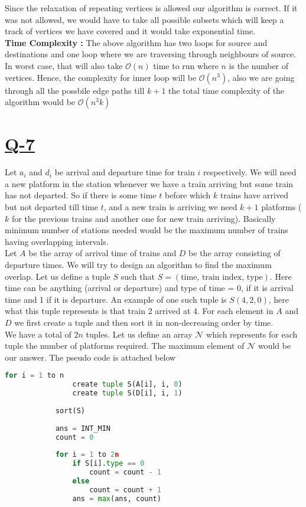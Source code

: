 \documentclass[14pt]{article}
\begin{document}
		Since the relaxation of repeating vertices is allowed our algorithm is correct. If it was not allowed, we would have to take all possible subsets which will keep a track of vertices we have covered and it would take exponential time.\\
		\textbf{Time Complexity : }The above algorithm has two loops for source and destinations and one loop where we are traversing through neighbours of source. In worst case, that will also take $\mathcal{O}(n)$ time to run where $n$ is the number of vertices. Hence, the complexity for inner loop will be $\mathcal{O}(n^3)$, also we are going through all the possbile edge paths till $k+1$ the total time complexity of the algorithm would be $\mathcal{O}(n^3k)$
	
	\section*{\underline{Q-7}}
		\noindent
		Let $a_i$ and $d_i$ be arrival and departure time for train $i$ respectively. We will need a new platform in the station whenever we have a train arriving but some train has not departed. So if there is some time $t$ before which $k$ trains have arrived but not departed till time $t$, and a new train is arriving we need $k+1$ platforms ($k$ for the previous trains and another one for new train arriving). Basically minimum number of stations needed would be the maximum number of trains having overlapping intervals.\\
		\newline
		Let $A$ be the array of arrival time of trains and $D$ be the array consisting of departure times. We will try to design an algorithm to find the maximum overlap. Let us define a tuple $S$ such that $S = (\text{time, train index, type})$. Here time can be anything (arrival or departure) and type of time = 0, if it is arrival time and 1 if it is departure. An example of one such tuple is $S(4, 2, 0)$, here what this tuple represents is that train 2 arrived at 4. For each element in $A$ and $D$ we first create a tuple and then sort it in non-decreasing order by time.\\
		\newline
		We have a total of $2n$ tuples. Let us define an array $\mathcal{N}$ which represents for each tuple the number of platforms required. The maximum element of $\mathcal{N}$ would be our answer. The pseudo code is attached below
		\begin{lstlisting}[language=python]
			for i = 1 to n
				create tuple S(A[i], i, 0)
				create tuple S(D[i], i, 1)
			
			sort(S)
			
			ans = INT_MIN
			count = 0
			
			for i = 1 to 2n
				if S[i].type == 0
					count = count - 1
				else 
					count = count + 1
				ans = max(ans, count)
		\end{lstlisting}
\end{document}
